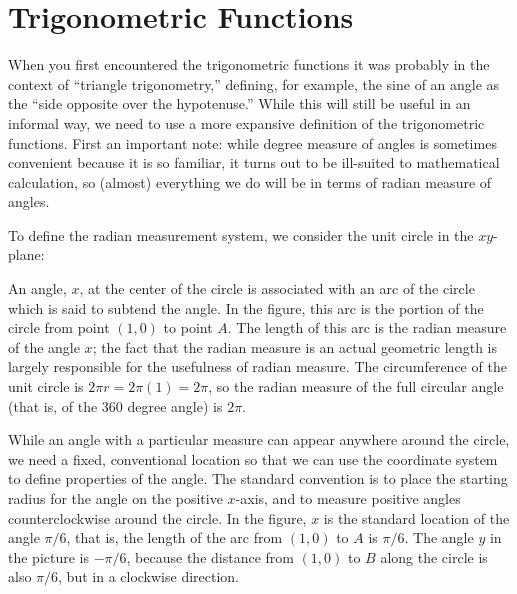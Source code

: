 \section{Trigonometric Functions}{}{}
\nobreak
When you first encountered the trigonometric functions it was probably
in the context of ``triangle trigonometry,'' defining, for example,
the sine of an angle as the ``side opposite over the hypotenuse.''
While this will still be useful in an informal way, we need to use a
more expansive definition of the trigonometric functions. First an
important note: while degree measure of angles is sometimes convenient
because it is so familiar, it turns out to be ill-suited to
mathematical calculation, so (almost) everything we do will be in
terms of {\dfont radian measure\/} of angles.

To define the radian measurement system,
we consider the unit circle in the $xy$-plane:

An angle, $x$, at the center of the circle is
associated with an arc of the circle which is said to {\dfont
  subtend} the angle. In the figure, this arc is the portion of
the circle from point $(1,0)$ to point $A$. The length of this arc is
the radian measure of the angle $x$; the fact that the radian measure
is an actual geometric length is largely responsible for the
usefulness of radian measure. The circumference of the unit circle is
$2\pi r=2\pi(1)=2\pi$, so the radian measure of the full circular
angle (that is, of the 360 degree angle) is $2\pi$.

While an angle with a particular measure can appear anywhere around
the circle, we need a fixed, conventional location so that we can use
the coordinate system to define properties of the angle. 
The standard convention is to place the starting radius for the angle
on the positive $x$-axis, and to measure positive angles
counterclockwise around the circle. In the figure, $x$ is the standard
location of the angle $\pi/6$, that is, the length of the arc from
$(1,0)$ to $A$ is $\pi/6$. The angle $y$ in the picture is $-\pi/6$,
because the distance from $(1,0)$ to $B$ along the circle is also 
$\pi/6$, but in a clockwise direction.

